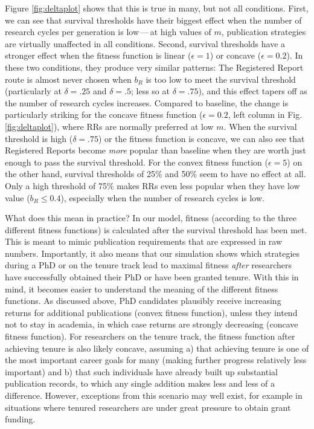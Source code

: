 \documentclass[
  ,man,mask,floatsintext]{apa6}
\begin{document}
Figure \ref{fig:deltaplot} shows that this is true in many, but not all conditions.
First, we can see that survival thresholds have their biggest effect when the number of research cycles per generation is low\(\,\)---\(\,\)at high values of \(m\), publication strategies are virtually unaffected in all conditions.
Second, survival thresholds have a stronger effect when the fitness function is linear (\(\epsilon = 1\)) or concave (\(\epsilon = 0.2\)).
In these two conditions, they produce very similar patterns:
The Registered Report route is almost never chosen when \(b_{R}\) is too low to meet the survival threshold (particularly at \(\delta = .25\) and \(\delta = .5\); less so at \(\delta = .75\)), and this effect tapers off as the number of research cycles increases.
Compared to baseline, the change is particularly striking for the concave fitness function (\(\epsilon = 0.2\), left column in Fig. \ref{fig:deltaplot}), where RRs are normally preferred at low \(m\).
When the survival threshold is high (\(\delta = .75\)) or the fitness function is concave, we can also see that Registered Reports become \emph{more} popular than baseline when they are worth just enough to pass the survival threshold.
For the convex fitness function (\(\epsilon = 5\)) on the other hand, survival thresholds of 25\% and 50\% seem to have no effect at all.
Only a high threshold of 75\% makes RRs even less popular when they have low value (\(b_{R}\leq 0.4\)), especially when the number of research cycles is low.

What does this mean in practice?
In our model, fitness (according to the three different fitness functions) is calculated after the survival threshold has been met.
This is meant to mimic publication requirements that are expressed in raw numbers.
Importantly, it also means that our simulation shows which strategies during a PhD or on the tenure track lead to maximal fitness \emph{after} researchers have successfully obtained their PhD or have been granted tenure.
With this in mind, it becomes easier to understand the meaning of the different fitness functions.
As discussed above, PhD candidates plausibly receive increasing returns for additional publications (convex fitness function), unless they intend not to stay in academia, in which case returns are strongly decreasing (concave fitness function).
For researchers on the tenure track, the fitness function after achieving tenure is also likely concave, assuming a) that achieving tenure is one of the most important career goals for many (making further progress relatively less important) and b) that such individuals have already built up substantial publication records, to which any single addition makes less and less of a difference.
However, exceptions from this scenario may well exist, for example in situations where tenured researchers are under great pressure to obtain grant funding.
\end{document}
